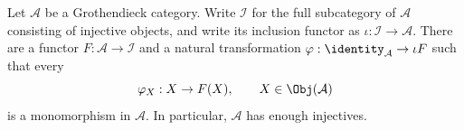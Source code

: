 \begin{theorem}[A.\ Grothendieck]\label{prop:Grothendieck-injective}
Let $\mathcal{A}$ be a Grothendieck category. Write $\mathcal{I}$ for the full
subcategory of $\mathcal{A}$ consisting of injective objects, and write its
inclusion functor as $\iota:\mathcal{I}\to\mathcal{A}$. There are a functor
$F:\mathcal{A}\to\mathcal{I}$ and a natural transformation
$\varphi:\identity_{\mathcal{A}}\to\iota F$ such that every
\[\varphi_X:X\to F(X),\qquad X\in\Obj(\mathcal{A})\]
is a monomorphism in $\mathcal{A}$. In particular, $\mathcal{A}$ has enough
injectives.
\end{theorem}

